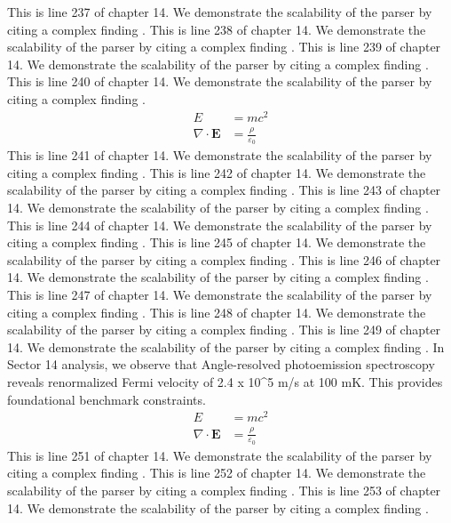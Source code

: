 This is line 237 of chapter 14. We demonstrate the scalability of the parser by citing a complex finding \cite{ref14_237}.
This is line 238 of chapter 14. We demonstrate the scalability of the parser by citing a complex finding \cite{ref14_238}.
This is line 239 of chapter 14. We demonstrate the scalability of the parser by citing a complex finding \cite{ref14_239}.
This is line 240 of chapter 14. We demonstrate the scalability of the parser by citing a complex finding \cite{ref14_240}.
\begin{align*}
  E &= mc^2 \\
  \nabla \cdot \mathbf{E} &= \frac{\rho}{\varepsilon_0}
\end{align*}
This is line 241 of chapter 14. We demonstrate the scalability of the parser by citing a complex finding \cite{ref14_241}.
This is line 242 of chapter 14. We demonstrate the scalability of the parser by citing a complex finding \cite{ref14_242}.
This is line 243 of chapter 14. We demonstrate the scalability of the parser by citing a complex finding \cite{ref14_243}.
This is line 244 of chapter 14. We demonstrate the scalability of the parser by citing a complex finding \cite{ref14_244}.
This is line 245 of chapter 14. We demonstrate the scalability of the parser by citing a complex finding \cite{ref14_245}.
This is line 246 of chapter 14. We demonstrate the scalability of the parser by citing a complex finding \cite{ref14_246}.
This is line 247 of chapter 14. We demonstrate the scalability of the parser by citing a complex finding \cite{ref14_247}.
This is line 248 of chapter 14. We demonstrate the scalability of the parser by citing a complex finding \cite{ref14_248}.
This is line 249 of chapter 14. We demonstrate the scalability of the parser by citing a complex finding \cite{ref14_249}.
In Sector 14 analysis, we observe that Angle-resolved photoemission spectroscopy reveals renormalized Fermi velocity of 2.4 x 10^5 m/s at 100 mK. This provides foundational benchmark constraints.
\begin{align*}
  E &= mc^2 \\
  \nabla \cdot \mathbf{E} &= \frac{\rho}{\varepsilon_0}
\end{align*}
This is line 251 of chapter 14. We demonstrate the scalability of the parser by citing a complex finding \cite{ref14_251}.
This is line 252 of chapter 14. We demonstrate the scalability of the parser by citing a complex finding \cite{ref14_252}.
This is line 253 of chapter 14. We demonstrate the scalability of the parser by citing a complex finding \cite{ref14_253}.
